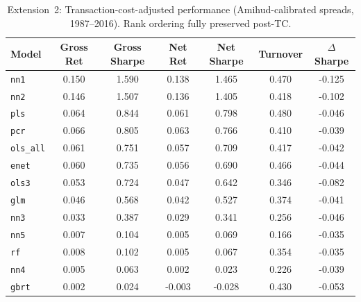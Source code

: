\begin{table}[H]
\centering
\caption{Extension~2: Transaction-cost-adjusted performance (Amihud-calibrated spreads, 1987--2016). Rank ordering fully preserved post-TC.}
\label{tab:tc}
\begin{tabular}{lcccccc}
\toprule
Model & Gross Ret & Gross Sharpe & Net Ret & Net Sharpe & Turnover & $\Delta$Sharpe \\
\midrule
\texttt{nn1} & 0.150 & 1.590 & 0.138 & 1.465 & 0.470 & -0.125 \\
\texttt{nn2} & 0.146 & 1.507 & 0.136 & 1.405 & 0.418 & -0.102 \\
\texttt{pls} & 0.064 & 0.844 & 0.061 & 0.798 & 0.480 & -0.046 \\
\texttt{pcr} & 0.066 & 0.805 & 0.063 & 0.766 & 0.410 & -0.039 \\
\texttt{ols\_all} & 0.061 & 0.751 & 0.057 & 0.709 & 0.417 & -0.042 \\
\texttt{enet} & 0.060 & 0.735 & 0.056 & 0.690 & 0.466 & -0.044 \\
\texttt{ols3} & 0.053 & 0.724 & 0.047 & 0.642 & 0.346 & -0.082 \\
\texttt{glm} & 0.046 & 0.568 & 0.042 & 0.527 & 0.374 & -0.041 \\
\texttt{nn3} & 0.033 & 0.387 & 0.029 & 0.341 & 0.256 & -0.046 \\
\texttt{nn5} & 0.007 & 0.104 & 0.005 & 0.069 & 0.166 & -0.035 \\
\texttt{rf} & 0.008 & 0.102 & 0.005 & 0.067 & 0.354 & -0.035 \\
\texttt{nn4} & 0.005 & 0.063 & 0.002 & 0.023 & 0.226 & -0.039 \\
\texttt{gbrt} & 0.002 & 0.024 & -0.003 & -0.028 & 0.430 & -0.053 \\
\bottomrule
\end{tabular}
\end{table}
